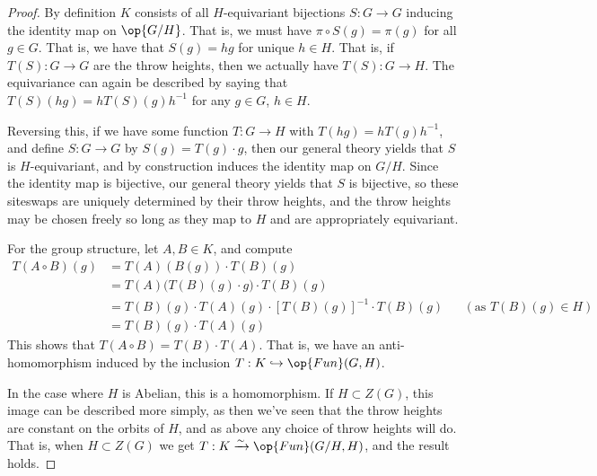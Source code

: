 \documentclass[12nt]{article}
\theoremstyle{plain}
\begin{document}
\begin{proof}
 By definition $K$ consists of all $H$-equivariant bijections $S : G \to G$ inducing the identity map on $\op{G/H}$. That is, we must have $\pi \circ S(g) = \pi(g)$ for all $g \in G$. That is, we have that $S(g) = hg$ for unique $h \in H$. That is, if $T(S) : G \to G$ are the throw heights, then we actually have $T(S) : G \to H$. The equivariance can again be described by saying that $T(S)(hg) = hT(S)(g)h^{-1}$ for any $g \in G$, $h \in H$. 

Reversing this, if we have some function $T : G \to H$ with $T(hg) = hT(g)h^{-1}$, and define $S : G \to G$ by $S(g) = T(g) \cdot g$, then our general theory yields that $S$ is $H$-equivariant, and by construction induces the identity map on $G/H$. Since the identity map is bijective, our general theory yields that $S$ is bijective, so these siteswaps are uniquely determined by their throw heights, and the throw heights may be chosen freely so long as they map to $H$ and are appropriately equivariant. 

For the group structure, let $A, B \in K$, and compute
\begin{align*}
T(A \circ B)(g) &= T(A)(B(g)) \cdot T(B)(g) \\
	&= T(A)\Big(T(B)(g) \cdot g\Big) \cdot T(B)(g) \\
	&= T(B)(g) \cdot  T(A)(g) \cdot [T(B)(g)]^{-1} \cdot T(B)(g) && (\text{as } T(B)(g) \in H) \\
	&= T(B)(g) \cdot T(A)(g)
\end{align*}
This shows that $T(A \circ B) = T(B) \cdot T(A)$. That is, we have an anti-homomorphism induced by the inclusion $T: K \hookrightarrow \op{Fun}(G, H)$.

In the case where $H$ is Abelian, this is a homomorphism. If $H \subset Z(G)$, this image can be described more simply, as then we've seen that the throw heights are constant on the orbits of $H$, and as above any choice of throw heights will do. That is, when $H \subset Z(G)$ we get $T : K \xrightarrow{\sim} \op{Fun}(G/H, H)$, and the result holds.

\end{proof}
\end{document}
